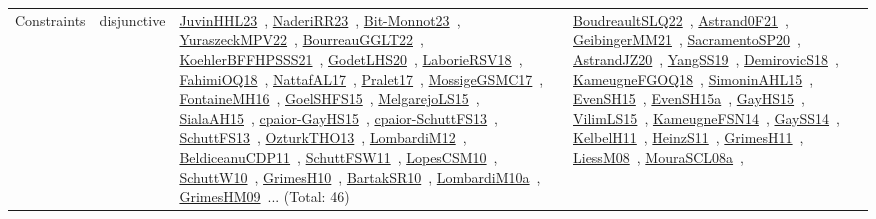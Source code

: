 {\begin{longtable}{lp{3cm}>{\raggedright\arraybackslash}p{6cm}>{\raggedright\arraybackslash}p{6cm}>{\raggedright\arraybackslash}p{8cm}}
Constraints & disjunctive & \href{papers/JuvinHHL23.pdf}{JuvinHHL23}~\cite{JuvinHHL23}, \href{articles/NaderiRR23.pdf}{NaderiRR23}~\cite{NaderiRR23}, \href{papers/Bit-Monnot23.pdf}{Bit-Monnot23}~\cite{Bit-Monnot23}, \href{articles/YuraszeckMPV22.pdf}{YuraszeckMPV22}~\cite{YuraszeckMPV22}, \href{articles/BourreauGGLT22.pdf}{BourreauGGLT22}~\cite{BourreauGGLT22}, \href{articles/KoehlerBFFHPSSS21.pdf}{KoehlerBFFHPSSS21}~\cite{KoehlerBFFHPSSS21}, \href{papers/GodetLHS20.pdf}{GodetLHS20}~\cite{GodetLHS20}, \href{articles/LaborieRSV18.pdf}{LaborieRSV18}~\cite{LaborieRSV18}, \href{articles/FahimiOQ18.pdf}{FahimiOQ18}~\cite{FahimiOQ18}, \href{articles/NattafAL17.pdf}{NattafAL17}~\cite{NattafAL17}, \href{papers/Pralet17.pdf}{Pralet17}~\cite{Pralet17}, \href{papers/MossigeGSMC17.pdf}{MossigeGSMC17}~\cite{MossigeGSMC17}, \href{papers/FontaineMH16.pdf}{FontaineMH16}~\cite{FontaineMH16}, \href{articles/GoelSHFS15.pdf}{GoelSHFS15}~\cite{GoelSHFS15}, \href{papers/MelgarejoLS15.pdf}{MelgarejoLS15}~\cite{MelgarejoLS15}, \href{papers/SialaAH15.pdf}{SialaAH15}~\cite{SialaAH15}, \href{papers/cpaior-GayHS15.pdf}{cpaior-GayHS15}~\cite{cpaior-GayHS15}, \href{papers/cpaior-SchuttFS13.pdf}{cpaior-SchuttFS13}~\cite{cpaior-SchuttFS13}, \href{papers/SchuttFS13.pdf}{SchuttFS13}~\cite{SchuttFS13}, \href{articles/OzturkTHO13.pdf}{OzturkTHO13}~\cite{OzturkTHO13}, \href{articles/LombardiM12.pdf}{LombardiM12}~\cite{LombardiM12}, \href{articles/BeldiceanuCDP11.pdf}{BeldiceanuCDP11}~\cite{BeldiceanuCDP11}, \href{articles/SchuttFSW11.pdf}{SchuttFSW11}~\cite{SchuttFSW11}, \href{articles/LopesCSM10.pdf}{LopesCSM10}~\cite{LopesCSM10}, \href{papers/SchuttW10.pdf}{SchuttW10}~\cite{SchuttW10}, \href{papers/GrimesH10.pdf}{GrimesH10}~\cite{GrimesH10}, \href{articles/BartakSR10.pdf}{BartakSR10}~\cite{BartakSR10}, \href{articles/LombardiM10a.pdf}{LombardiM10a}~\cite{LombardiM10a}, \href{papers/GrimesHM09.pdf}{GrimesHM09}~\cite{GrimesHM09}... (Total: 46) & \href{papers/BoudreaultSLQ22.pdf}{BoudreaultSLQ22}~\cite{BoudreaultSLQ22}, \href{papers/Astrand0F21.pdf}{Astrand0F21}~\cite{Astrand0F21}, \href{papers/GeibingerMM21.pdf}{GeibingerMM21}~\cite{GeibingerMM21}, \href{articles/SacramentoSP20.pdf}{SacramentoSP20}~\cite{SacramentoSP20}, \href{articles/AstrandJZ20.pdf}{AstrandJZ20}~\cite{AstrandJZ20}, \href{papers/YangSS19.pdf}{YangSS19}~\cite{YangSS19}, \href{papers/DemirovicS18.pdf}{DemirovicS18}~\cite{DemirovicS18}, \href{papers/KameugneFGOQ18.pdf}{KameugneFGOQ18}~\cite{KameugneFGOQ18}, \href{articles/SimoninAHL15.pdf}{SimoninAHL15}~\cite{SimoninAHL15}, \href{papers/EvenSH15.pdf}{EvenSH15}~\cite{EvenSH15}, \href{articles/EvenSH15a.pdf}{EvenSH15a}~\cite{EvenSH15a}, \href{papers/GayHS15.pdf}{GayHS15}~\cite{GayHS15}, \href{papers/VilimLS15.pdf}{VilimLS15}~\cite{VilimLS15}, \href{articles/KameugneFSN14.pdf}{KameugneFSN14}~\cite{KameugneFSN14}, \href{papers/GaySS14.pdf}{GaySS14}~\cite{GaySS14}, \href{articles/KelbelH11.pdf}{KelbelH11}~\cite{KelbelH11}, \href{papers/HeinzS11.pdf}{HeinzS11}~\cite{HeinzS11}, \href{papers/GrimesH11.pdf}{GrimesH11}~\cite{GrimesH11}, \href{articles/LiessM08.pdf}{LiessM08}~\cite{LiessM08}, \href{papers/MouraSCL08a.pdf}{MouraSCL08a}~\cite{MouraSCL08a}, 
\end{longtable}}
